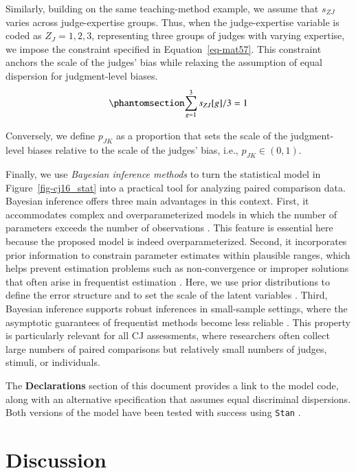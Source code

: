 \documentclass[
  authoryear,
  review,
  1p]{elsarticle}
\begin{document}
Similarly, building on the same teaching-method example, we assume that
\(s_{ZJ}\) varies across judge-expertise groups. Thus, when the
judge-expertise variable is coded as \(Z_{J} = {1,2,3}\), representing
three groups of judges with varying expertise, we impose the constraint
specified in Equation~\ref{eq-mat57}. This constraint anchors the scale
of the judges' bias while relaxing the assumption of equal dispersion
for judgment-level biases.
\begin{equation}\protect\phantomsection\label{eq-mat57}{
\sum_{g=1}^{3} s_{ZJ}[g]/3 = 1
}\end{equation}

Conversely, we define \(p_{JK}\) as a proportion that sets the scale of
the judgment-level biases relative to the scale of the judges' bias,
i.e., \(p_{JK} \in (0,1)\).

Finally, we use \emph{Bayesian inference methods} to turn the
statistical model in Figure~\ref{fig-cj16_stat} into a practical tool
for analyzing paired comparison data. Bayesian inference offers three
main advantages in this context. First, it accommodates complex and
overparameterized models in which the number of parameters exceeds the
number of observations \citep{Baker_1998, Kim_et_al_1999}. This feature
is essential here because the proposed model is indeed
overparameterized. Second, it incorporates prior information to
constrain parameter estimates within plausible ranges, which helps
prevent estimation problems such as non-convergence or improper
solutions that often arise in frequentist estimation
\citep{Martin_et_al_1975, Seaman_et_al_2011}. Here, we use prior
distributions to define the error structure and to set the scale of the
latent variables \citep{Depaoli_2014}. Third, Bayesian inference
supports robust inferences in small-sample settings, where the
asymptotic guarantees of frequentist methods become less reliable
\citep{Baldwin_et_al_2013, Lambert_et_al_2006, Depaoli_2014}. This
property is particularly relevant for all CJ assessments, where
researchers often collect large numbers of paired comparisons but
relatively small numbers of judges, stimuli, or individuals.

The \textbf{Declarations} section of this document provides a link to
the model code, along with an alternative specification that assumes
equal discriminal dispersions. Both versions of the model have been
tested with success using \texttt{Stan} \citep[version
2.26.1,][]{Stan_2026a, Stan_2026a}.

\section{Discussion}\label{sec-discussion}
\end{document}
